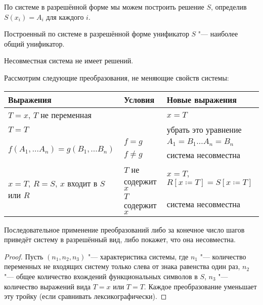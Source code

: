 По системе в разрешённой форме мы можем построить решение $S$, определив $S(x_i) = A_i$ для каждого $i$.

\begin{statement}
    Построенный по системе в разрешённой форме унификатор $S$ "--- наиболее общий унификатор.
\end{statement}

\begin{statement}
    Несовместная система не имеет решений.
\end{statement}

Рассмотрим следующие преобразования, не меняющие свойств системы:
\begin{center}
\begin{tabular}{l l l} \toprule
    Выражения                         & Условия             & Новые выражения \\ \midrule
    $T=x$, $T$ не переменная          &                     & $x=T$ \\ \midrule
    $T=T$                             &                     & убрать это уравнение \\ \midrule
    \multirow{2}{*}[-\aboverulesep]{$f(A_1, \ldots A_n) = g(B_1, \ldots B_n)$}
                                      & $f=g$               & $ A_1 = B_1 \ldots A_n = B_n$ \\ \cmidrule{2-3}
                                      & $f \neq g$          & система несовместна \\ \midrule
    \multirow{2}{*}[-\aboverulesep]{$x=T$, $R=S$, $x$ входит в $S$ или $R$}
                                      & $T$ не содержит $x$ & $x=T$,
                                        $R\left[x\coloneqq T\right]=S\left[x\coloneqq T\right]$\\ \cmidrule{2-3}
                                      & $T$ содержит $x$    & система несовместна \\ \bottomrule
\end{tabular}
\end{center}

\begin{statement}
    Последовательное применение преобразований либо за конечное число шагов приведёт систему в разрешённый вид,
    либо покажет, что она несовместна.
\end{statement}

\begin{proof}
    Пусть $(n_1, n_2, n_3)$ "--- характеристика системы, где
    $n_1$ "--- количество переменных не входящих систему только слева от знака равенства один раз,
    $n_2$ "--- общее количество вхождений функциональных символов в $S$,
    $n_3$ "--- количество выражений вида $T=x$ или $T=T$.
    Каждое преобразование уменьшает эту тройку (если сравнивать лексикографически).
\end{proof}

